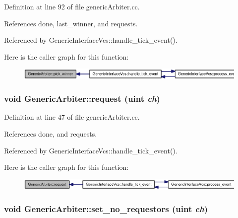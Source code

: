Definition at line 92 of file genericArbiter.cc.

References done, last\_\-winner, and requests.

Referenced by GenericInterfaceVcs::handle\_\-tick\_\-event().

Here is the caller graph for this function:\nopagebreak
\begin{figure}[H]
\begin{center}
\leavevmode
\includegraphics[width=420pt]{classGenericArbiter_4a5b38f3d16471a75c0c35fc1ecb3031_icgraph}
\end{center}
\end{figure}
\subsubsection[{request}]{\setlength{\rightskip}{0pt plus 5cm}void GenericArbiter::request ({\bf uint} {\em ch})}\label{classGenericArbiter_88ab811caecaf5738fc32143a35a482f}




Definition at line 47 of file genericArbiter.cc.

References done, and requests.

Referenced by GenericInterfaceVcs::handle\_\-tick\_\-event().

Here is the caller graph for this function:\nopagebreak
\begin{figure}[H]
\begin{center}
\leavevmode
\includegraphics[width=414pt]{classGenericArbiter_88ab811caecaf5738fc32143a35a482f_icgraph}
\end{center}
\end{figure}
\subsubsection[{set\_\-no\_\-requestors}]{\setlength{\rightskip}{0pt plus 5cm}void GenericArbiter::set\_\-no\_\-requestors ({\bf uint} {\em ch})}\label{classGenericArbiter_3994d2b032f4774b73c923c78c05d81a}




